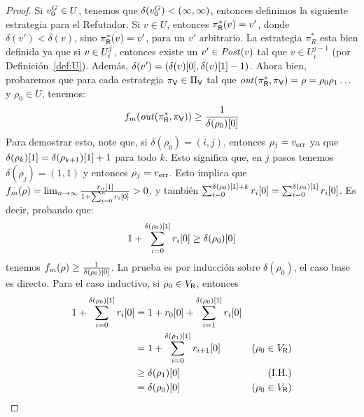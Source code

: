 \begin{proof}
	Si $\InitVertex^G \in U$, tenemos que $\delta(\InitVertex^G) < (\infty, \infty)$, entonces definimos la siguiente estrategia para el Refutador. 
	Si $v \in U$, entonces $\pi^*_\Refuter(v)= v'$, donde $\delta(v') < \delta(v)$, sino $\pi^*_\Refuter(v)=v'$, para un $v'$ arbitrario. 
	La estrategia $\pi^*_R$ esta bien definida ya que si $v \in \setsUs$, entonces existe un $v' \in \post(v)$ tal que $v \in U^{j-1}_i$ (por Definición~\ref{def:U}). Además, $\delta(v') = (\pr{0}{\delta(v)}, \pr{1}{\delta(v)} - 1)$.  
	Ahora bien, probaremos que para cada estrategia $\pi_\Verifier \in \Pi_\Verifier$ tal que $\out(\pi^*_\Refuter, \pi_\Verifier) = \rho = \rho_0 \rho_1 \dots$ y $\rho_0 \in U$, tenemos:
\begin{equation}\label{eq:inf-bound}
	\FMask(\out(\pi^*_\Refuter, \pi_\Verifier)) \geq \frac{1}{ \pr{0}{\delta(\rho_0)}}
\end{equation} 
		Para demostrar esto, note que, si $\delta(\rho_0)= (i,j)$, entonces $\rho_j =\ErrorSt$ 
		ya que $\pr{1}{\delta(\rho_k)} = \pr{1}{\delta(\rho_{k+1})}+1$ para todo $k$. 
Esto significa que, en $j$ pasos tenemos $\delta(\rho_{j}) = (1,1)$ y entonces $\rho_{j} = \ErrorSt$.
	Esto implica que $\FMask(\rho) =  \lim_{n \rightarrow \infty}  \frac{\pr{1}{r_n}}{1+ \sum^{n}_{i=0} \pr{0}{r_i}} >0$, y también
$ \sum^{\pr{1}{\delta(\rho_0)} + k}_{i=0} \pr{0}{r_i} =  \sum^{\pr{1}{\delta(\rho_0)}}_{i=0} \pr{0}{r_i}$.
	 Es decir, probando que:
\begin{equation}\label{eq:bottom-sum}
 1+ \sum^{\pr{1}{\delta(\rho_0)}}_{i=0} \pr{0}{r_i} \geq \pr{0}{\delta(\rho_0)}
\end{equation} 
tenemos $\FMask(\rho) \geq \frac{1}{ \pr{0}{\delta(\rho_0)}}$. La prueba es por inducción sobre $\delta(\rho_0)$, el caso base es directo.
 Para el caso inductivo, si $\rho_0 \in V_\Refuter$, entonces
\begin{align*}
 	1 + \sum^{\pr{1}{\delta(\rho_0)}}_{i=0} \pr{0}{r_i} & =  1 + \pr{0}{r_0} + \sum^{\pr{1}{\delta(\rho_0)}}_{i=1} \pr{0}{r_i} & \\
					     & =   1+ \sum^{\pr{1}{\delta(\rho_1)}}_{i=0} \pr{0}{r_{i+1}} &  \text{($\rho_0 \in V_\Refuter$)}\\
					     & \geq \pr{0}{\delta(\rho_1)} & \text{(I.H.)} \\
					     & = \pr{0}{\delta(\rho_0)} & \text{($\rho_0 \in V_\Refuter$)}

\end{align*}
\end{proof}
